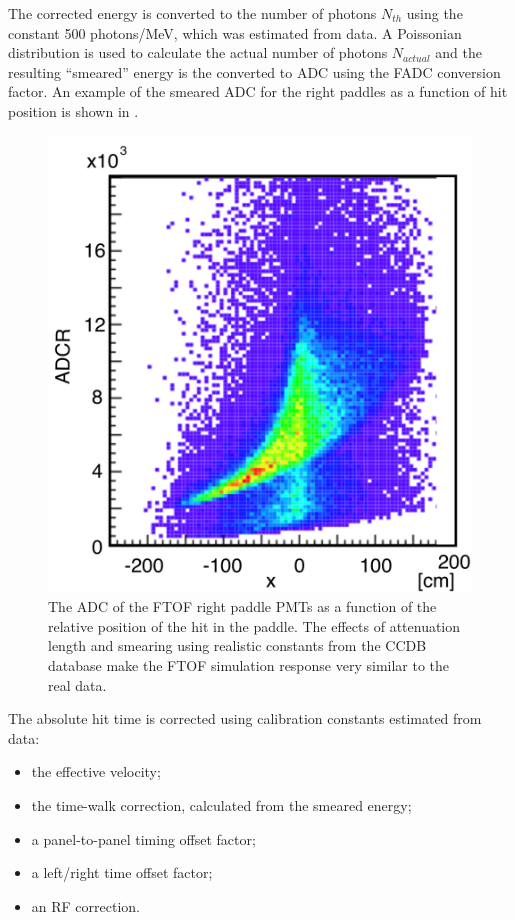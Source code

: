 The corrected energy is converted to the number of photons $N_{th}$ using the constant 500 photons/MeV, which was
estimated from data. A Poissonian distribution is used to calculate the actual number of photons $N_{actual}$ and the
resulting ``smeared'' energy is the converted to ADC using the FADC conversion factor. An example of the smeared
ADC for the right paddles as a function of hit position is shown in .

\begin{figure}
	\centering
	\includegraphics[width=0.99\columnwidth,keepaspectratio]{img/ftofAtten.png}
	\caption{The ADC of the FTOF right paddle PMTs as a function of the relative position of the hit in the paddle.
             The effects of attenuation length and smearing using realistic constants from the CCDB database make
             the FTOF simulation response very similar to the real data.}
	\label{fig:ftofAtten}
\end{figure}

The absolute hit time is corrected using calibration constants estimated from data:

\begin{itemize}
	\item the effective velocity;
	\item the time-walk correction, calculated from the smeared energy;
	\item a panel-to-panel timing offset factor;
	\item a left/right time offset factor;
	\item an RF correction.
\end{itemize}

